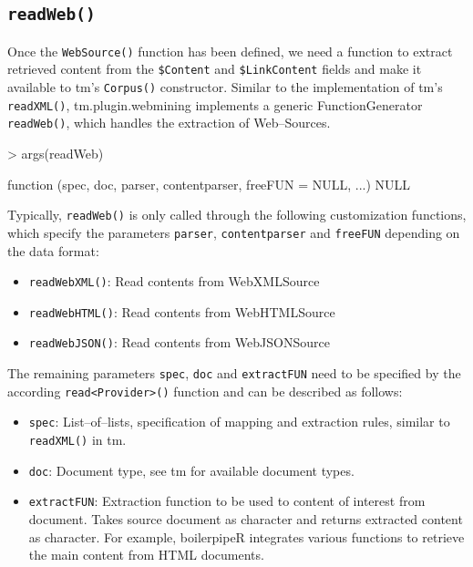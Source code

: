 \documentclass[a4paper]{article}
\newcommand{\class}[1]{\mbox{\textsf{#1}}}
\newcommand{\code}[1]{\mbox{\texttt{#1}}}
\newcommand{\pkg}[1]{{\normalfont\fontseries{b}\selectfont #1}}
\newcommand{\proglang}[1]{\textsf{#1}}
\newcommand{\fkt}[1]{\code{#1()}}
\newcommand{\field}[1]{\code{\$#1}}
\begin{document}
\subsection{\fkt{readWeb}}
Once the \fkt{WebSource} function has been defined, we need a function to extract retrieved content from
the \field{Content} and \field{LinkContent} fields and make it available to \pkg{tm}'s \fkt{Corpus}
constructor. Similar to the implementation of \pkg{tm}'s \fkt{readXML}, \pkg{tm.plugin.webmining} implements a 
generic \class{FunctionGenerator} \fkt{readWeb}, which handles the extraction of Web--\class{Source}s.

\begin{Schunk}
\begin{Sinput}
> args(readWeb)
\end{Sinput}
\begin{Soutput}
function (spec, doc, parser, contentparser, freeFUN = NULL, ...) 
NULL
\end{Soutput}
\end{Schunk}

Typically, \fkt{readWeb} is only called through the following customization functions, which specify
the parameters \code{parser}, \code{contentparser} and \code{freeFUN} depending on the data format:

\begin{itemize}
\item \fkt{readWebXML}: Read contents from \class{WebXMLSource}
\item \fkt{readWebHTML}: Read contents from \class{WebHTMLSource}
\item \fkt{readWebJSON}: Read contents from \class{WebJSONSource}
\end{itemize}

The remaining parameters \code{spec}, \code{doc} and \code{extractFUN} need to be specified by the
according \fkt{read<Provider>} function and can be described as follows:
\begin{itemize}
\item \code{spec}: List--of--lists, specification of mapping and extraction rules, similar to \fkt{readXML} in \pkg{tm}.
\item \code{doc}: Document type, see \pkg{tm} for available document types.
\item \code{extractFUN}: Extraction function to be used to content of interest from document. Takes source
document as \class{character} and returns extracted content as \class{character}. For example, \pkg{boilerpipeR} 
integrates various functions to retrieve the main content from \proglang{HTML} documents.
\end{itemize}
\end{document}
